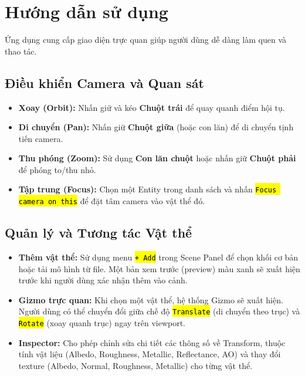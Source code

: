 \documentclass[a4paper]{article}
\newcommand{\code}[1]{\hl{\texttt{#1}}}
\begin{document}
\section{Hướng dẫn sử dụng}
\hspace{12pt}
Ứng dụng cung cấp giao diện trực quan giúp người dùng dễ dàng làm quen và thao tác.

\subsection{Điều khiển Camera và Quan sát}
\hspace{12pt}
\begin{itemize}
  \item \textbf{Xoay (Orbit):} Nhấn giữ và kéo \textbf{Chuột trái} để quay quanh điểm hội tụ.
  \item \textbf{Di chuyển (Pan):} Nhấn giữ \textbf{Chuột giữa} (hoặc con lăn) để di chuyển tịnh tiến camera.
  \item \textbf{Thu phóng (Zoom):} Sử dụng \textbf{Con lăn chuột} hoặc nhấn giữ \textbf{Chuột phải} để phóng to/thu nhỏ.
  \item \textbf{Tập trung (Focus):} Chọn một Entity trong danh sách và nhấn \code{Focus camera on this} để đặt tâm camera vào vật thể đó.
\end{itemize}

\subsection{Quản lý và Tương tác Vật thể}
\hspace{12pt}
\begin{itemize}
  \item \textbf{Thêm vật thể:} Sử dụng menu \code{+ Add} trong Scene Panel để chọn khối cơ bản hoặc tải mô hình từ file. Một bản xem trước (preview) màu xanh sẽ xuất hiện trước khi người dùng xác nhận thêm vào cảnh.
  \item \textbf{Gizmo trực quan:} Khi chọn một vật thể, hệ thống Gizmo sẽ xuất hiện. Người dùng có thể chuyển đổi giữa chế độ \code{Translate} (di chuyển theo trục) và \code{Rotate} (xoay quanh trục) ngay trên viewport.
  \item \textbf{Inspector:} Cho phép chỉnh sửa chi tiết các thông số về Transform, thuộc tính vật liệu (Albedo, Roughness, Metallic, Reflectance, AO) và thay đổi texture (Albedo, Normal, Roughness, Metallic) cho từng vật thể.
\end{itemize}
\end{document}

